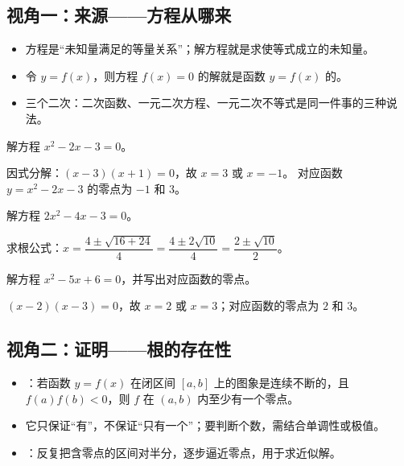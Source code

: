 \begin{explore}
\subsection{视角一：来源——方程从哪来}

\begin{itemize}
  \item 方程是“未知量满足的等量关系”；解方程就是求使等式成立的未知量。
  \item 令 $y=f(x)$，则方程 $f(x)=0$ 的解就是函数 $y=f(x)$ 的。
  \item 三个二次：二次函数、一元二次方程、一元二次不等式是同一件事的三种说法。
\end{itemize}

\begin{example}
解方程 $x^2-2x-3=0$。
\end{example}
\begin{solution}
因式分解：$(x-3)(x+1)=0$，故 $x=3$ 或 $x=-1$。
对应函数 $y=x^2-2x-3$ 的零点为 $-1$ 和 $3$。
\end{solution}

\begin{example}
解方程 $2x^2-4x-3=0$。
\end{example}
\begin{solution}
求根公式：$x=\dfrac{4\pm\sqrt{16+24}}{4}=\dfrac{4\pm2\sqrt{10}}{4}=\dfrac{2\pm\sqrt{10}}{2}$。
\end{solution}

\begin{problem}
解方程 $x^2-5x+6=0$，并写出对应函数的零点。
\end{problem}
\begin{solution}
$(x-2)(x-3)=0$，故 $x=2$ 或 $x=3$；对应函数的零点为 $2$ 和 $3$。
\end{solution}

\subsection{视角二：证明——根的存在性}

\begin{itemize}
  \item {}：若函数 $y=f(x)$ 在闭区间 $[a,b]$ 上的图象是连续不断的，且 $f(a)f(b)<0$，则 $f$ 在 $(a,b)$ 内至少有一个零点。
  \item 它只保证“有”，不保证“只有一个”；要判断个数，需结合单调性或极值。
  \item {}：反复把含零点的区间对半分，逐步逼近零点，用于求近似解。
\end{itemize}


\end{explore}
